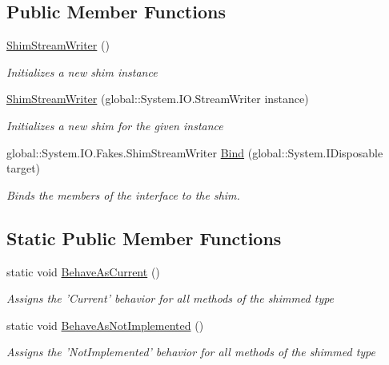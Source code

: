 \subsection*{Public Member Functions}
\begin{DoxyCompactItemize}
\item 
\hyperlink{class_system_1_1_i_o_1_1_fakes_1_1_shim_stream_writer_a0505c91dbe45f3962df85419bc9c02a6}{Shim\-Stream\-Writer} ()
\begin{DoxyCompactList}\small\item\em Initializes a new shim instance\end{DoxyCompactList}\item 
\hyperlink{class_system_1_1_i_o_1_1_fakes_1_1_shim_stream_writer_a56f41080ce048bdd43f2007aa780c910}{Shim\-Stream\-Writer} (global\-::\-System.\-I\-O.\-Stream\-Writer instance)
\begin{DoxyCompactList}\small\item\em Initializes a new shim for the given instance\end{DoxyCompactList}\item 
global\-::\-System.\-I\-O.\-Fakes.\-Shim\-Stream\-Writer \hyperlink{class_system_1_1_i_o_1_1_fakes_1_1_shim_stream_writer_ac75b4e77cbe7f790f2661ccac7895f8e}{Bind} (global\-::\-System.\-I\-Disposable target)
\begin{DoxyCompactList}\small\item\em Binds the members of the interface to the shim.\end{DoxyCompactList}\end{DoxyCompactItemize}
\subsection*{Static Public Member Functions}
\begin{DoxyCompactItemize}
\item 
static void \hyperlink{class_system_1_1_i_o_1_1_fakes_1_1_shim_stream_writer_a62c8fb557f9c8a1243c49a46fa3449f8}{Behave\-As\-Current} ()
\begin{DoxyCompactList}\small\item\em Assigns the 'Current' behavior for all methods of the shimmed type\end{DoxyCompactList}\item 
static void \hyperlink{class_system_1_1_i_o_1_1_fakes_1_1_shim_stream_writer_a4aa3bc93c028dd65e8db5e4b011567ce}{Behave\-As\-Not\-Implemented} ()
\begin{DoxyCompactList}\small\item\em Assigns the 'Not\-Implemented' behavior for all methods of the shimmed type\end{DoxyCompactList}\end{DoxyCompactItemize}
